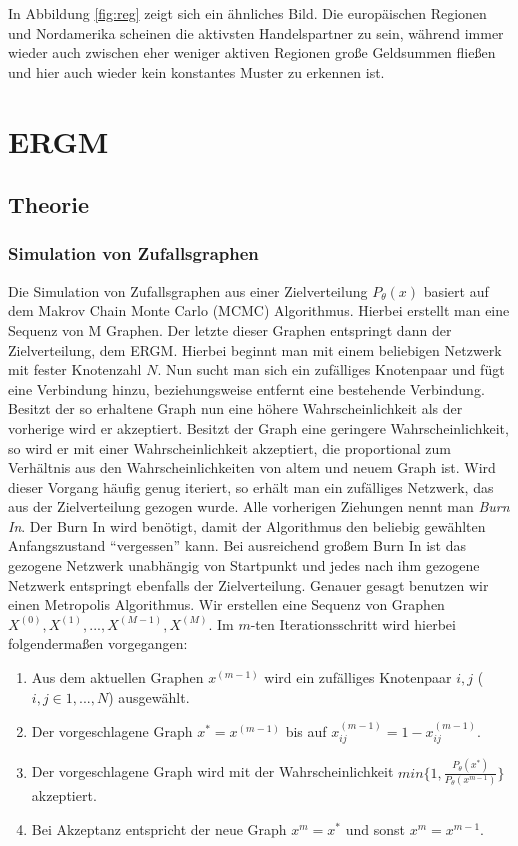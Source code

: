 \documentclass[a4paper,ngerman,oneside,titlepage,bibliography=totoc,11pt]{scrreprt}
\begin{document}
In Abbildung \ref{fig:reg} zeigt sich ein ähnliches Bild. Die europäischen Regionen und Nordamerika scheinen die aktivsten Handelspartner zu sein, während immer wieder auch zwischen eher weniger aktiven Regionen große Geldsummen fließen und hier auch wieder kein konstantes Muster zu erkennen ist.  

\chapter{ERGM}
\section{Theorie}
\subsection{Simulation von Zufallsgraphen}
Die Simulation von Zufallsgraphen aus einer Zielverteilung $P_\theta(x)$ basiert auf dem Makrov Chain Monte Carlo (MCMC) Algorithmus. Hierbei erstellt man eine Sequenz von M Graphen. Der letzte dieser Graphen entspringt dann der Zielverteilung, dem ERGM. Hierbei beginnt man mit einem beliebigen Netzwerk mit fester Knotenzahl $N$. Nun sucht man sich ein zufälliges Knotenpaar und fügt eine Verbindung hinzu, beziehungsweise entfernt eine bestehende Verbindung. Besitzt der so erhaltene Graph nun eine höhere Wahrscheinlichkeit als der vorherige wird er akzeptiert. Besitzt der Graph eine geringere Wahrscheinlichkeit, so wird er mit einer Wahrscheinlichkeit akzeptiert, die proportional zum Verhältnis aus den Wahrscheinlichkeiten von altem und neuem Graph ist. Wird dieser Vorgang häufig genug iteriert, so erhält man ein zufälliges Netzwerk, das aus der Zielverteilung gezogen wurde. Alle vorherigen Ziehungen nennt man \emph{Burn In}. Der Burn In wird benötigt, damit der Algorithmus den beliebig gewählten Anfangszustand "`vergessen"' kann. Bei ausreichend großem Burn In ist das gezogene Netzwerk unabhängig von Startpunkt und jedes nach ihm gezogene Netzwerk entspringt ebenfalls der Zielverteilung.
Genauer gesagt benutzen wir einen Metropolis Algorithmus. Wir erstellen eine Sequenz von Graphen $X^{(0)}, X^{(1)}, ..., X^{(M-1)}, X^{(M)}$. Im $m$-ten Iterationsschritt wird hierbei folgendermaßen vorgegangen:

\begin{enumerate}
	\item Aus dem aktuellen Graphen $x^(m-1)$ wird ein zufälliges Knotenpaar $i,j$ ($i,j \in 1, ...,N$) ausgewählt.
	\item Der vorgeschlagene Graph $x^* = x^{(m-1)}$ bis auf $x_{ij}^{(m-1)} = 1 - x_{ij}^{(m-1)}$.
	\item Der vorgeschlagene Graph wird mit der Wahrscheinlichkeit $min\{1, \frac{P_{\theta}(x^*)}{P_{\theta}(x^{m-1})}\}$ akzeptiert.
	\item Bei Akzeptanz entspricht der neue Graph $x^m = x^*$ und sonst $x^m = x^{m-1}$.
\end{enumerate}
\end{document}

